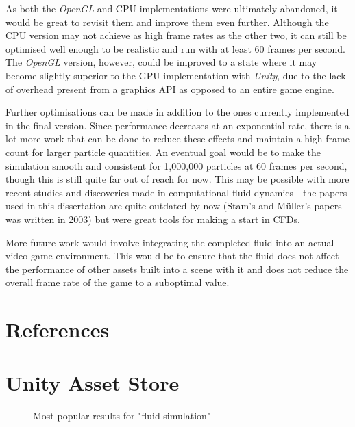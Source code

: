 \documentclass[12pt]{article}
\newcommand{\wideimage}[2][]{%
  \makebox[\textwidth][c]{\texttt{[image: \#2]}}%
}
\begin{document}
    As both the \textit{OpenGL} and CPU implementations were ultimately abandoned, it would be great to revisit them and improve them even further. Although the CPU version may not achieve as high frame rates as the other two, it can still be optimised well enough to be realistic and run with at least 60 frames per second. The \textit{OpenGL} version, however, could be improved to a state where it may become slightly superior to the GPU implementation with \textit{Unity}, due to the lack of overhead present from a graphics API as opposed to an entire game engine.

    Further optimisations can be made in addition to the ones currently implemented in the final version. Since performance decreases at an exponential rate, there is a lot more work that can be done to reduce these effects and maintain a high frame count for larger particle quantities. An eventual goal would be to make the simulation smooth and consistent for 1,000,000 particles at 60 frames per second, though this is still quite far out of reach for now. This may be possible with more recent studies and discoveries made in computational fluid dynamics - the papers used in this dissertation are quite outdated by now (Stam's  and Müller's papers was written in 2003) but were great tools for making a start in CFDs.

    More future work would involve integrating the completed fluid into an actual video game environment. This would be to ensure that the fluid does not affect the performance of other assets built into a scene with it and does not reduce the overall frame rate of the game to a suboptimal value.

    \newpage

    \section{References}
    \label{sec:references}
    

    \newpage

    \appendix
    \label{sec:appendices}

    \section{Unity Asset Store}

    \begin{figure}[H]
        \wideimage[width=1.4\textwidth]{unityStore1.png}
        \caption{Most popular results for "fluid simulation" \cite{unityasset}}
    \end{figure}
\end{document}
